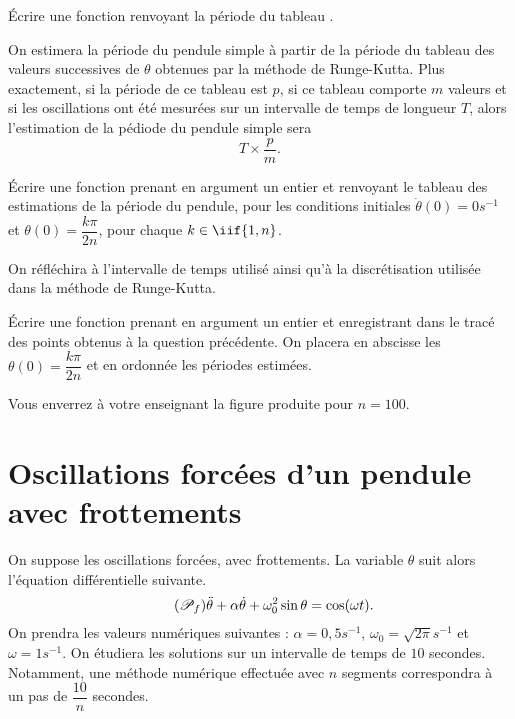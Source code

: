 \medskip{}

\question{} \'Ecrire une fonction  renvoyant la période du tableau .

\medskip{}

On estimera la période du pendule simple à partir de la période du tableau des valeurs successives de $\theta$ obtenues par la méthode de Runge-Kutta. 
Plus exactement, si la période de ce tableau est $p$, si ce tableau comporte $m$ valeurs et si les oscillations ont été mesurées sur un intervalle de temps de longueur $T$, alors l'estimation de la pédiode du pendule simple sera 
\begin{equation*}
    T \times \dfrac{p}{m}.
\end{equation*}


\medskip{}

\question{} \'Ecrire une fonction  prenant en argument un entier  et renvoyant le tableau des estimations de la période du pendule, pour les conditions initiales $\dot{\theta}(0) = 0s^{-1}$ et $\theta(0) = \dfrac{k\pi}{2n}$, pour chaque $k \in \iif{1,n}$.

\medskip{}

On réfléchira à l'intervalle de temps utilisé ainsi qu'à la discrétisation utilisée dans la méthode de Runge-Kutta.

\medskip{}

\question{\label{qu:periode}} \'Ecrire une fonction  prenant en argument un entier  et enregistrant dans  le tracé des points obtenus à la question précédente. 
  On placera en abscisse les $\theta(0) = \dfrac{k\pi}{2n}$ et en ordonnée les périodes estimées.

  Vous enverrez à votre enseignant la figure produite pour $n=100$.
  
\section{Oscillations forcées d'un pendule avec frottements}

On suppose les oscillations forcées, avec frottements. 
La variable $\theta$ suit alors l'équation différentielle suivante.
\begin{equation}\label{eq:penduleforce}\tag{$\mathscr{P}_f$}
  \ddot{\theta} + \alpha\dot{\theta}+\omega_0^2\sin\theta = \cos(\omega t).
\end{equation}
On prendra les valeurs numériques suivantes : $\alpha = 0,5 s^{-1}$, $\omega_0 = \sqrt{2\pi} s^{-1}$ et $\omega = 1s^{-1}$.
On étudiera les solutions sur un intervalle de temps de $10$ secondes. 
Notamment, une méthode numérique effectuée avec $n$ segments correspondra à un pas de $\dfrac{10}{n}$ secondes. 

